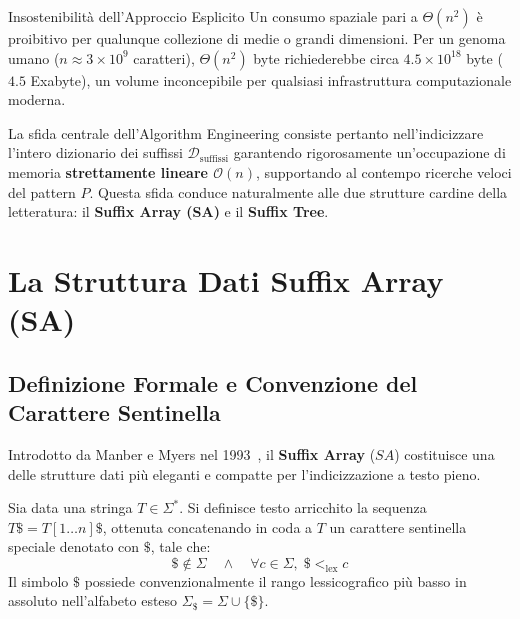 \begin{alertblock}{Insostenibilit\`a dell'Approccio Esplicito}
Un consumo spaziale pari a $\Theta(n^2)$ \`e proibitivo per qualunque collezione di medie o grandi dimensioni. Per un genoma umano ($n \approx 3 \times 10^9$ caratteri), $\Theta(n^2)$ byte richiederebbe circa $4.5 \times 10^{18}$ byte ($4.5$ Exabyte), un volume inconcepibile per qualsiasi infrastruttura computazionale moderna.
\end{alertblock}

La sfida centrale dell'Algorithm Engineering consiste pertanto nell'indicizzare l'intero dizionario dei suffissi $\mathcal{D}_{\text{suffissi}}$ garantendo rigorosamente un'occupazione di memoria \textbf{strettamente lineare $\mathcal{O}(n)$}, supportando al contempo ricerche veloci del pattern $P$. Questa sfida conduce naturalmente alle due strutture cardine della letteratura: il \textbf{Suffix Array (SA)} e il \textbf{Suffix Tree}.

\FloatBarrier
\section{La Struttura Dati Suffix Array (SA)}
\label{sec:suffix-array}

\FloatBarrier
\subsection{Definizione Formale e Convenzione del Carattere Sentinella}
\label{subsec:definizione-sentinella-sa}

Introdotto da Manber e Myers nel 1993~\cite{manber1993}, il \textbf{Suffix Array} ($SA$) costituisce una delle strutture dati pi\`u eleganti e compatte per l'indicizzazione a testo pieno.

\begin{definition}
Sia data una stringa $T \in \Sigma^*$. Si definisce testo arricchito la sequenza $T\$ = T[1 \dots n]\$$, ottenuta concatenando in coda a $T$ un carattere sentinella speciale denotato con $\$$, tale che:
\begin{equation}
  \$ \notin \Sigma \quad \land \quad \forall c \in \Sigma, \; \$ <_{\text{lex}} c
\end{equation}
Il simbolo $\$$ possiede convenzionalmente il rango lessicografico pi\`u basso in assoluto nell'alfabeto esteso $\Sigma_{\$} = \Sigma \cup \{\$\}$.
\end{definition}

